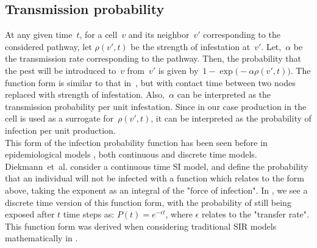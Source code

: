 \documentclass[10pt]{article}
\newcommand{\infest}{\rho}
\theoremstyle{definition}
\begin{document}
\subsection{Transmission probability}\label{trans}
At any given time~$t$, for a cell~$v$ and its neighbor~$v'$ corresponding
to the considered pathway, let $\infest(v',t)$ be the strength of
infestation at~$v'$. Let,~$\alpha$ be the transmission rate corresponding
to the pathway. Then, the probability that the pest will be introduced
to~$v$ from~$v'$ is given by~$1-\exp\big(-\alpha\infest(v',t)\big)$. The
function form is similar to that in~\cite{newman2002spread,meyers2007}, but with
contact time between two nodes replaced with strength of infestation. Also,~$\alpha$ can be interpreted as the transmission probability
per unit infestation. Since in our case production in the cell is used as a
surrogate for~$\infest(v',t)$, it can be interpreted as the
probability of infection per unit production. \\

This form of the infection probability function has been seen before in
epidemiological models
\cite{diekmann2000mathematical,hethcote1989periodicity,hethcote1994thousand},
both continuous and discrete time models. Diekmann~et~al.
\cite{diekmann2000mathematical} 
consider a continuous time SI model, and define the probability that an
individual will not be infected with a function which relates to the form
above, taking the exponent as an integral of the "force of infection". 
In \cite{hethcote1994thousand}, we see a discrete time version of this
function form, with the probability of still being exposed after $t$ time
steps as: $P(t) = e^{-\epsilon t}$, where $\epsilon$ relates to the
"transfer rate". This function form was derived when considering
traditional SIR models mathematically in \cite{hethcote1989periodicity}.
\end{document}
